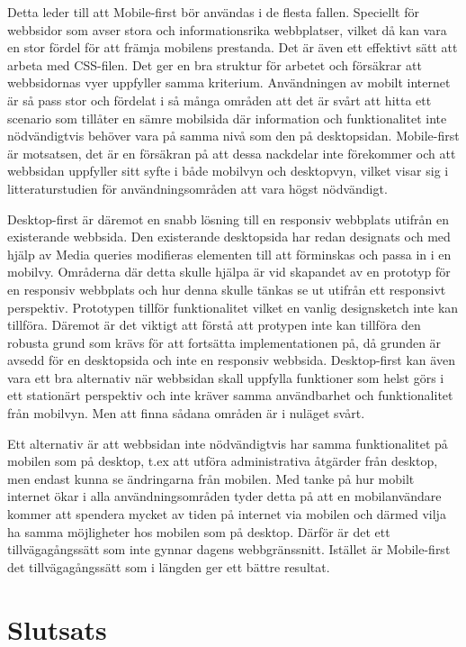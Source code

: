 \documentclass[11pt]{article}
\begin{document}
Detta leder till att Mobile-first bör användas i de flesta fallen. Speciellt för webbsidor som avser stora och informationsrika webbplatser, vilket då kan vara en stor fördel för att främja mobilens prestanda. Det är även ett effektivt sätt att arbeta med CSS-filen. Det ger en bra struktur för arbetet och försäkrar att webbsidornas vyer uppfyller samma kriterium. Användningen av mobilt internet är så pass stor och fördelat i så många områden att det är svårt att hitta ett scenario som tillåter en sämre mobilsida där information och funktionalitet inte nödvändigtvis behöver vara på samma nivå som den på desktopsidan. Mobile-first är motsatsen, det är en försäkran på att dessa nackdelar inte förekommer och att webbsidan uppfyller sitt syfte i både mobilvyn och desktopvyn, vilket visar sig i litteraturstudien för användningsområden att vara högst nödvändigt. 

Desktop-first är däremot en snabb lösning till en responsiv webbplats utifrån en existerande webbsida. Den existerande desktopsida har redan designats och med hjälp av Media queries modifieras elementen till att förminskas och passa in i en mobilvy. Områderna där detta skulle hjälpa är vid skapandet av en prototyp för en responsiv webbplats och hur denna skulle tänkas se ut utifrån ett responsivt perspektiv. Prototypen tillför funktionalitet vilket en vanlig designsketch inte kan tillföra. Däremot är det viktigt att förstå att protypen inte kan tillföra den robusta grund som krävs för att fortsätta implementationen på, då grunden är avsedd för en desktopsida och inte en responsiv webbsida. Desktop-first kan även vara ett bra alternativ när webbsidan skall uppfylla funktioner som helst görs i ett stationärt perspektiv och inte kräver samma användbarhet och funktionalitet från mobilvyn. Men att finna sådana områden är i nuläget svårt. 

Ett alternativ är att webbsidan inte nödvändigtvis har samma funktionalitet på mobilen som på desktop, t.ex att utföra administrativa åtgärder från desktop, men endast kunna se ändringarna från mobilen. Med tanke på hur mobilt internet ökar i alla användningsområden tyder detta på att en mobilanvändare kommer att spendera mycket av tiden på internet via mobilen och därmed vilja ha samma möjligheter hos mobilen som på desktop. Därför är det ett tillvägagångssätt som inte gynnar dagens webbgränssnitt. Istället är Mobile-first det tillvägagångssätt som i längden ger ett bättre resultat.

\newpage
\section{Slutsats}
\end{document}

